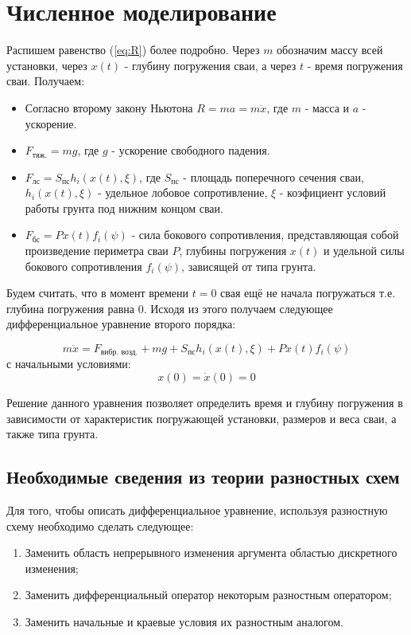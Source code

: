 \clearpage

\section{Численное моделирование}

Распишем равенство (\ref{eq:R}) более подробно. Через $m$ обозначим массу всей установки, через $x(t)$ - глубину
погружения сваи, а через $t$ - время погружения сваи. Получаем:

\begin{itemize}
\item Согласно второму закону Ньютона $R = ma = m\ddot{x}$, где $m$ - масса и $a$ - ускорение.
\item $F_\text{тяж.} = mg$, где $g$ - ускорение свободного падения.
\item $F_\text{лс} = S_\text{пс} h_i(x(t), \xi)$, где $S_\text{пс}$ - площадь поперечного сечения сваи,
$h_i(x(t), \xi)$ - удельное лобовое сопротивление, $\xi$ - коэфициент условий работы грунта под нижним концом сваи.
\item $F_\text{бс} = P x(t) f_i(\psi)$ - сила бокового сопротивления, представляющая собой произведение периметра сваи
$P$, глубины погружения $x(t)$ и удельной силы бокового сопротивления $f_i(\psi)$, зависящей от типа грунта.
\end{itemize}

\noindent Будем считать, что в момент времени $t = 0$ свая ещё не начала погружаться т.е. глубина погружения равна 0.
Исходя из этого получаем следующее дифференциальное уравнение второго порядка:

\begin{equation}
    \label{eq:main}
    m\ddot{x} = F_\text{вибр. возд.} + mg + S_\text{пс} h_i(x(t), \xi) + P x(t) f_i(\psi)
\end{equation}
с начальными условиями:
\begin{equation}
    \label{eq:main-conditions}
    x(0) = \dot{x}(0) = 0
\end{equation}

Решение данного уравнения позволяет определить время и глубину погружения в зависимости от характеристик погружающей
установки, размеров и веса сваи, а также типа грунта.

\subsection{Необходимые сведения из теории разностных схем}

Для того, чтобы описать дифференциальное уравнение, используя разностную схему необходимо сделать следующее:
\begin{enumerate}
    \item Заменить область непрерывного изменения аргумента областью дискретного изменения;
    \item Заменить дифференциальный оператор некоторым разностным оператором;
    \item Заменить начальные и краевые условия их разностным аналогом.
\end{enumerate}


